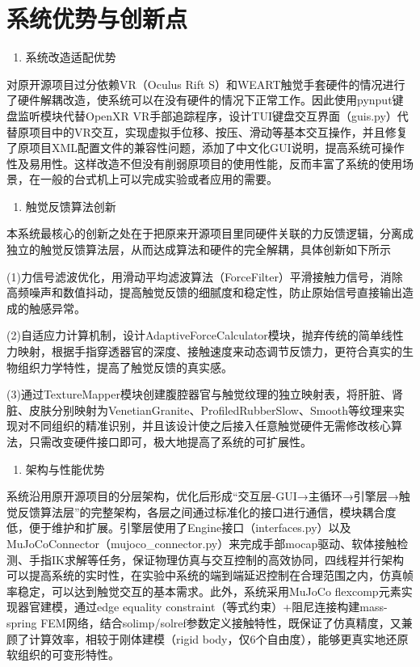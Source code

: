 \section{系统优势与创新点}

\begin{enumerate}
\def\labelenumi{\arabic{enumi}.}
\item
  系统改造适配优势
\end{enumerate}

对原开源项目过分依赖VR（Oculus Rift
S）和WEART触觉手套硬件的情况进行了硬件解耦改造，使系统可以在没有硬件的情况下正常工作。因此使用pynput键盘监听模块代替OpenXR
VR手部追踪程序，设计TUI键盘交互界面（guis.py）代替原项目中的VR交互，实现虚拟手位移、按压、滑动等基本交互操作，并且修复了原项目XML配置文件的兼容性问题，添加了中文化GUI说明，提高系统可操作性及易用性。这样改造不但没有削弱原项目的使用性能，反而丰富了系统的使用场景，在一般的台式机上可以完成实验或者应用的需要。

\begin{enumerate}
\def\labelenumi{\arabic{enumi}.}
\setcounter{enumi}{1}
\item
  触觉反馈算法创新
\end{enumerate}

本系统最核心的创新之处在于把原来开源项目里同硬件关联的力反馈逻辑，分离成独立的触觉反馈算法层，从而达成算法和硬件的完全解耦，具体创新如下所示

(1)力信号滤波优化，用滑动平均滤波算法（ForceFilter）平滑接触力信号，消除高频噪声和数值抖动，提高触觉反馈的细腻度和稳定性，防止原始信号直接输出造成的触感异常。

(2)自适应力计算机制，设计AdaptiveForceCalculator模块，抛弃传统的简单线性力映射，根据手指穿透器官的深度、接触速度来动态调节反馈力，更符合真实的生物组织力学特性，提高了触觉反馈的真实感。

(3)通过TextureMapper模块创建腹腔器官与触觉纹理的独立映射表，将肝脏、肾脏、皮肤分别映射为VenetianGranite、ProfiledRubberSlow、Smooth等纹理来实现对不同组织的精准识别，并且该设计使之后接入任意触觉硬件无需修改核心算法，只需改变硬件接口即可，极大地提高了系统的可扩展性。

\begin{enumerate}
\def\labelenumi{\arabic{enumi}.}
\setcounter{enumi}{2}
\item
  架构与性能优势
\end{enumerate}

系统沿用原开源项目的分层架构，优化后形成``交互层-GUI→主循环→引擎层→触觉反馈算法层''的完整架构，各层之间通过标准化的接口进行通信，模块耦合度低，便于维护和扩展。引擎层使用了Engine接口（interfaces.py）以及MuJoCoConnector（mujoco\_connector.py）来完成手部mocap驱动、软体接触检测、手指IK求解等任务，保证物理仿真与交互控制的高效协同，四线程并行架构可以提高系统的实时性，在实验中系统的端到端延迟控制在合理范围之内，仿真帧率稳定，可以达到触觉交互的基本需求。此外，系统采用MuJoCo
flexcomp元素实现器官建模，通过edge equality
constraint（等式约束）+阻尼连接构建mass-spring
FEM网络，结合solimp/solref参数定义接触特性，既保证了仿真精度，又兼顾了计算效率，相较于刚体建模（rigid
body，仅6个自由度），能够更真实地还原软组织的可变形特性。

